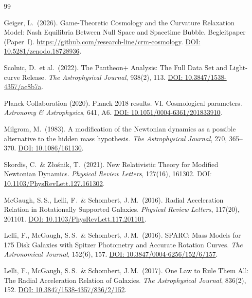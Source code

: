 \documentclass[aps,prd,twocolumn,superscriptaddress,nofootinbib,floatfix]{revtex4-2}
\begin{document}
\begin{thebibliography}{99}

Geiger, L.\ (2026).
Game-Theoretic Cosmology and the Curvature Relaxation Model: Nash Equilibria Between Null Space and Spacetime Bubble.
Begleitpaper (Paper~I). \url{https://github.com/research-line/crm-cosmology}. \href{https://doi.org/10.5281/zenodo.18728936}{DOI: 10.5281/zenodo.18728936}.

Scolnic, D.\ et al.\ (2022).
The Pantheon+ Analysis: The Full Data Set and Light-curve Release.
\textit{The Astrophysical Journal}, 938(2), 113.
\href{https://doi.org/10.3847/1538-4357/ac8b7a}{DOI: 10.3847/1538-4357/ac8b7a}.

Planck Collaboration (2020).
Planck 2018 results. VI. Cosmological parameters.
\textit{Astronomy \& Astrophysics}, 641, A6.
\href{https://doi.org/10.1051/0004-6361/201833910}{DOI: 10.1051/0004-6361/201833910}.

Milgrom, M.\ (1983).
A modification of the Newtonian dynamics as a possible alternative to the hidden mass hypothesis.
\textit{The Astrophysical Journal}, 270, 365--370.
\href{https://doi.org/10.1086/161130}{DOI: 10.1086/161130}.

Skordis, C.\ \& Z{\l}o\'snik, T.\ (2021).
New Relativistic Theory for Modified Newtonian Dynamics.
\textit{Physical Review Letters}, 127(16), 161302.
\href{https://doi.org/10.1103/PhysRevLett.127.161302}{DOI: 10.1103/PhysRevLett.127.161302}.

McGaugh, S.\,S., Lelli, F.\ \& Schombert, J.\,M.\ (2016).
Radial Acceleration Relation in Rotationally Supported Galaxies.
\textit{Physical Review Letters}, 117(20), 201101.
\href{https://doi.org/10.1103/PhysRevLett.117.201101}{DOI: 10.1103/PhysRevLett.117.201101}.

Lelli, F., McGaugh, S.\,S.\ \& Schombert, J.\,M.\ (2016).
SPARC: Mass Models for 175 Disk Galaxies with Spitzer Photometry and Accurate Rotation Curves.
\textit{The Astronomical Journal}, 152(6), 157.
\href{https://doi.org/10.3847/0004-6256/152/6/157}{DOI: 10.3847/0004-6256/152/6/157}.

Lelli, F., McGaugh, S.\,S.\ \& Schombert, J.\,M.\ (2017).
One Law to Rule Them All: The Radial Acceleration Relation of Galaxies.
\textit{The Astrophysical Journal}, 836(2), 152.
\href{https://doi.org/10.3847/1538-4357/836/2/152}{DOI: 10.3847/1538-4357/836/2/152}.


\end{thebibliography}
\end{document}
